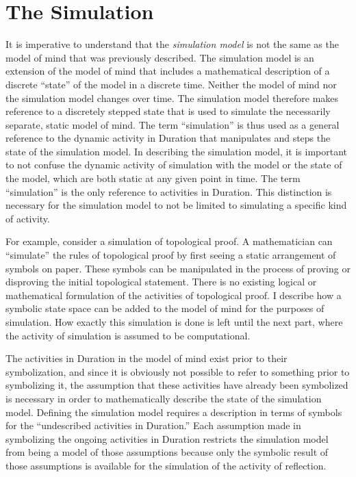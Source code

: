 \chapter{The Simulation}
\label{chapter:the_simulation}

It is imperative to understand that the \emph{simulation model} is not
the same as the model of mind that was previously described.  The
simulation model is an extension of the model of mind that includes a
mathematical description of a discrete ``state'' of the model in a
discrete time.  Neither the model of mind nor the simulation model
changes over time.  The simulation model therefore makes reference to
a discretely stepped state that is used to simulate the necessarily
separate, static model of mind.  The term ``simulation'' is thus used
as a general reference to the dynamic activity in Duration that
manipulates and steps the state of the simulation model.  In
describing the simulation model, it is important to not confuse the
dynamic activity of simulation with the model or the state of the
model, which are both static at any given point in time.  The term
``simulation'' is the only reference to activities in Duration.  This
distinction is necessary for the simulation model to not be limited to
simulating a specific kind of activity.

For example, consider a simulation of topological proof.  A
mathematician can ``simulate'' the rules of topological proof by first
seeing a static arrangement of symbols on paper.  These symbols can be
manipulated in the process of proving or disproving the initial
topological statement.  There is no existing logical or mathematical
formulation of the activities of topological proof.  I describe how a
symbolic state space can be added to the model of mind for the
purposes of simulation.  How exactly this simulation is done is left
until the next part, where the activity of simulation is assumed to be
computational.

The activities in Duration in the model of mind exist prior to their
symbolization, and since it is obviously not possible to refer to
something prior to symbolizing it, the assumption that these
activities have already been symbolized is necessary in order to
mathematically describe the state of the simulation model.  Defining
the simulation model requires a description in terms of symbols for
the ``undescribed activities in Duration.''  Each assumption made in
symbolizing the ongoing activities in Duration restricts the
simulation model from being a model of those assumptions because only
the symbolic result of those assumptions is available for the
simulation of the activity of reflection.

